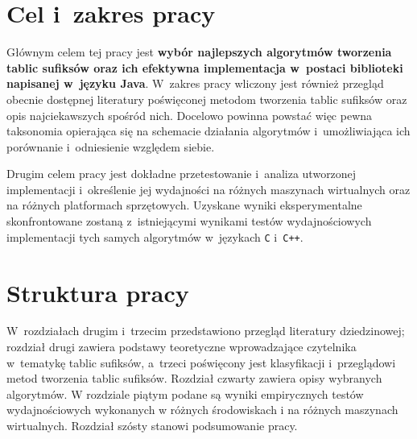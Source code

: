 \section{Cel i~zakres pracy}

Głównym celem tej pracy jest \textbf{wybór najlepszych algorytmów tworzenia tablic sufiksów oraz
ich  efektywna implementacja w~postaci biblioteki  napisanej w~języku Java}.  W~zakres pracy wliczony jest również przegląd obecnie dostępnej literatury poświęconej  metodom
tworzenia tablic sufiksów oraz opis najciekawszych spośród nich. Docelowo powinna powstać
więc pewna taksonomia opierająca się na schemacie działania algorytmów i~umożliwiająca ich porównanie i~odniesienie względem siebie. 

Drugim celem pracy jest dokładne przetestowanie i~analiza utworzonej implementacji i~określenie jej wydajności na różnych
maszynach wirtualnych oraz na różnych platformach sprzętowych. Uzyskane wyniki eksperymentalne
skonfrontowane zostaną z~istniejącymi wynikami testów wydajnościowych implementacji tych
samych algorytmów w~językach \texttt{C} i~\texttt{C++}. 

\section{Struktura pracy}

W~rozdziałach drugim i~trzecim przedstawiono przegląd literatury dziedzinowej; rozdział drugi
zawiera podstawy teoretyczne wprowadzające czytelnika w~tematykę tablic sufiksów, a~trzeci
poświęcony jest klasyfikacji i~przeglądowi metod tworzenia tablic sufiksów. Rozdział czwarty zawiera
opisy wybranych algorytmów. W rozdziale piątym podane są wyniki empirycznych testów 
wydajnościowych wykonanych w różnych środowiskach i na różnych maszynach wirtualnych. 
Rozdział szósty stanowi podsumowanie pracy.

